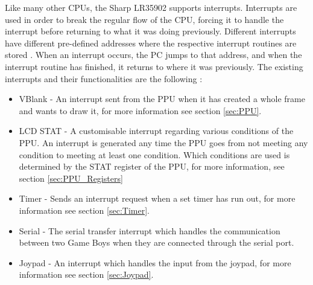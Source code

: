 Like many other CPUs, the Sharp LR35902 supports interrupts. Interrupts are used in order to break the regular flow of the CPU, forcing it to handle the interrupt before returning to what it was doing previously.
Different interrupts have different pre-defined addresses where the respective interrupt routines are stored \cite{pandocsinterrupts}. When an interrupt occurs, the PC jumps to that address, and when the interrupt routine has finished, it returns to where it was previously. The existing interrupts and their functionalities are the following \cite{pandocsinterrupts}:
\\
\begin{itemize}
    \item VBlank - An interrupt sent from the PPU when it has created a whole frame and wants to draw it, for more information see section \ref{sec:PPU}.
    \item LCD STAT - A customisable interrupt regarding various conditions of the PPU. An interrupt is generated any time the PPU goes from not meeting any condition to meeting at least one condition. Which conditions are used is determined by the STAT register of the PPU, for more information, see section \ref{sec:PPU_Registers}
    \item Timer - Sends an interrupt request when a set timer has run out, for more information see  section \ref{sec:Timer}.
    \item Serial - The serial transfer interrupt which handles the communication between two Game Boys when they are connected through the serial port.
    \item Joypad - An interrupt which handles the input from the joypad, for more information see section \ref{sec:Joypad}.
    \\
\end{itemize}

